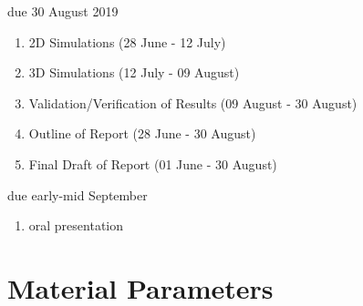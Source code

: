 \documentclass[12pt,twoside]{article}
\theoremstyle{break}
\begin{document}
\vspace{0.3cm}
{\color{red} due 30 August 2019} 

\begin{enumerate}[resume]
    \item 2D Simulations (28 June - 12 July)
    \item 3D Simulations (12 July - 09 August)
    \item Validation/Verification of Results (09 August - 30 August)
    \item Outline of Report (28 June - 30 August)
    \item Final Draft of Report (01 June - 30 August)
\end{enumerate}

\vspace{0.3cm}
{\color{red} due early-mid September}

\begin{enumerate}[resume]
    \item oral presentation
\end{enumerate}

\newpage
%
\printbibliography
%
%
\appendix
\newpage
\section{Material Parameters}
\label{ch:MaterialParameters}
\end{document}
